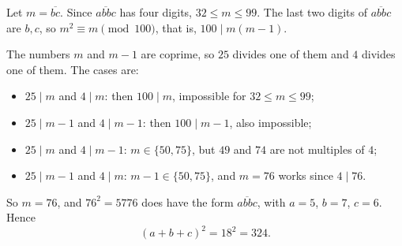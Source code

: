 Let $m=\overline{bc}$. Since $\overline{abbc}$ has four digits, $32\le m\le99$. The last two digits of $\overline{abbc}$ are $b,c$, so $m^2\equiv m\pmod{100}$, that is, $100\mid m(m-1)$.

The numbers $m$ and $m-1$ are coprime, so $25$ divides one of them and $4$ divides one of them. The cases are:
\begin{itemize}
\item $25\mid m$ and $4\mid m$: then $100\mid m$, impossible for $32\le m\le 99$;
\item $25\mid m-1$ and $4\mid m-1$: then $100\mid m-1$, also impossible;
\item $25\mid m$ and $4\mid m-1$: $m\in\{50,75\}$, but $49$ and $74$ are not multiples of $4$;
\item $25\mid m-1$ and $4\mid m$: $m-1\in\{50,75\}$, and $m=76$ works since $4\mid76$.
\end{itemize}
So $m=76$, and $76^2=5776$ does have the form $\overline{abbc}$, with $a=5$, $b=7$, $c=6$. Hence
\[
(a+b+c)^2=18^2=\boxed{324}.
\]
